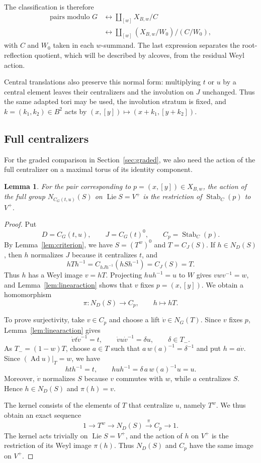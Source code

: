 \documentclass[11pt,a4paper,reqno]{amsart}
\theoremstyle{plain}
\newtheorem{lemma}[theorem]{Lemma}
\theoremstyle{definition}
\theoremstyle{remark}
\numberwithin{equation}{section}
\DeclareMathOperator{\Lie}{Lie}
\DeclareMathOperator{\Stab}{Stab}
\DeclareMathOperator{\Ad}{Ad}
\begin{document}
The classification is therefore
\[
\begin{aligned}
\text{pairs modulo }G &\longleftrightarrow\coprod_{[w]}X_{B,w}/C\\
&\longleftrightarrow\coprod_{[w]}(X_{B,w}/W_0)/(C/W_0),
\end{aligned}
\]
with $C$ and $W_0$ taken in each $w$-summand. The last expression separates the root-reflection quotient, which will be described by alcoves, from the residual Weyl action.

Central translations also preserve this normal form: multiplying $t$ or $u$ by a central element leaves their centralizers and the involution on $J$ unchanged. Thus the same adapted tori may be used, the involution stratum is fixed, and $k=(k_1,k_2)\in B^2$ acts by $(x,[y])\mapsto(x+k_1,[y+k_2])$.

\subsection{Full centralizers}

For the graded comparison in Section~\ref{sec:graded}, we also need the action of the full centralizer on a maximal torus of its identity component.

\begin{lemma}\label{lem:centralizer} For the pair corresponding to $p=(x,[y])\in X_{B,w}$, the action of the full group $N_{C_G(t,u)}(S)$ on $\Lie S=V^+$ is the restriction of $\Stab_C(p)$ to $V^+$.
\end{lemma}
\begin{proof}
Put
\[
D=C_G(t,u),\qquad J=C_G(t)^0,\qquad C_p=\Stab_C(p).
\]
By Lemma~\ref{lem:criterion}, we have $S=(T^w)^0$ and $T=C_J(S)$. If $h\in N_D(S)$, then $h$ normalizes $J$ because it centralizes $t$, and
\[
hTh^{-1}=C_{hJh^{-1}}(hSh^{-1})=C_J(S)=T.
\]
Thus $h$ has a Weyl image $v=hT$. Projecting $huh^{-1}=u$ to $W$ gives $vwv^{-1}=w$, and Lemma~\ref{lem:linearaction} shows that $v$ fixes $p=(x,[y])$. We obtain a homomorphism
\[
\pi\colon N_D(S)\longrightarrow C_p,\qquad h\longmapsto hT.
\]

To prove surjectivity, take $v\in C_p$ and choose a lift $\dot v\in N_G(T)$. Since $v$ fixes $p$, Lemma~\ref{lem:linearaction} gives
\[
\dot v t\dot v^{-1}=t,\qquad \dot v u\dot v^{-1}=\delta u,\qquad \delta\in T_-.
\]
As $T_-=(1-w)T$, choose $a\in T$ such that $a\,w(a)^{-1}=\delta^{-1}$ and put $h=a\dot v$. Since $(\Ad u)|_T=w$, we have
\[
hth^{-1}=t,\qquad huh^{-1}=\delta\,a\,w(a)^{-1}u=u.
\]
Moreover, $\dot v$ normalizes $S$ because $v$ commutes with $w$, while $a$ centralizes $S$. Hence $h\in N_D(S)$ and $\pi(h)=v$.

The kernel consists of the elements of $T$ that centralize $u$, namely $T^w$. We thus obtain an exact sequence
\[
1\longrightarrow T^w\longrightarrow N_D(S) \xrightarrow{\ \pi\ }C_p\longrightarrow1.
\]
The kernel acts trivially on $\Lie S=V^+$, and the action of $h$ on $V^+$ is the restriction of its Weyl image $\pi(h)$. Thus $N_D(S)$ and $C_p$ have the same image on $V^+$.
\end{proof}
\end{document}
